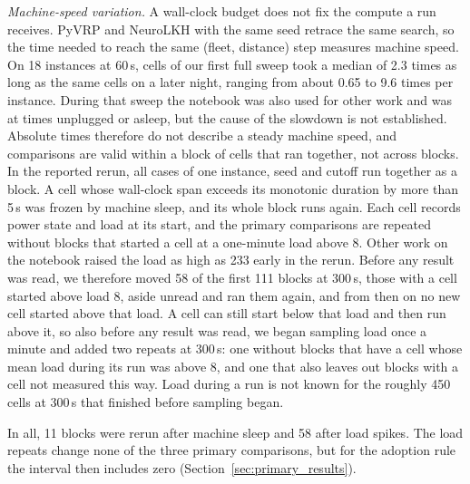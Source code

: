 \documentclass{ieeeaccess}
\begin{document}
\textit{Machine-speed variation.} A wall-clock budget does not fix the compute a run receives. PyVRP and NeuroLKH with the same seed retrace the same search, so the time needed to reach the same (fleet, distance) step measures machine speed. On 18 instances at 60\,s, cells of our first full sweep took a median of 2.3 times as long as the same cells on a later night, ranging from about 0.65 to 9.6 times per instance. During that sweep the notebook was also used for other work and was at times unplugged or asleep, but the cause of the slowdown is not established. Absolute times therefore do not describe a steady machine speed, and comparisons are valid within a block of cells that ran together, not across blocks. In the reported rerun, all cases of one instance, seed and cutoff run together as a block. A cell whose wall-clock span exceeds its monotonic duration by more than 5\,s was frozen by machine sleep, and its whole block runs again. Each cell records power state and load at its start, and the primary comparisons are repeated without blocks that started a cell at a one-minute load above 8. Other work on the notebook raised the load as high as 233 early in the rerun. Before any result was read, we therefore moved 58 of the first 111 blocks at 300\,s, those with a cell started above load 8, aside unread and ran them again, and from then on no new cell started above that load. A cell can still start below that load and then run above it, so also before any result was read, we began sampling load once a minute and added two repeats at 300\,s: one without blocks that have a cell whose mean load during its run was above 8, and one that also leaves out blocks with a cell not measured this way. Load during a run is not known for the roughly 450 cells at 300\,s that finished before sampling began.

In all, 11 blocks were rerun after machine sleep and 58 after load spikes. The load repeats change none of the three primary comparisons, but for the adoption rule the interval then includes zero (Section~\ref{sec:primary_results}).
\end{document}
